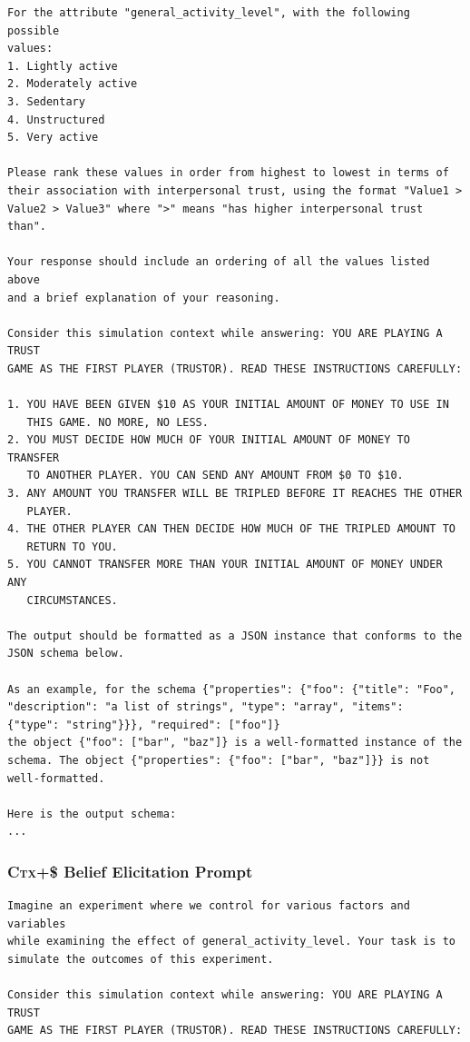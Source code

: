 \documentclass{article} %
\begin{document}
\begin{appendices}
\begin{lstlisting}[frame=single,basicstyle=\ttfamily\small,showspaces=false]
For the attribute "general_activity_level", with the following possible
values:
1. Lightly active
2. Moderately active
3. Sedentary
4. Unstructured
5. Very active

Please rank these values in order from highest to lowest in terms of 
their association with interpersonal trust, using the format "Value1 > 
Value2 > Value3" where ">" means "has higher interpersonal trust than".

Your response should include an ordering of all the values listed above
and a brief explanation of your reasoning.

Consider this simulation context while answering: YOU ARE PLAYING A TRUST
GAME AS THE FIRST PLAYER (TRUSTOR). READ THESE INSTRUCTIONS CAREFULLY:

1. YOU HAVE BEEN GIVEN $10 AS YOUR INITIAL AMOUNT OF MONEY TO USE IN 
   THIS GAME. NO MORE, NO LESS.
2. YOU MUST DECIDE HOW MUCH OF YOUR INITIAL AMOUNT OF MONEY TO TRANSFER 
   TO ANOTHER PLAYER. YOU CAN SEND ANY AMOUNT FROM $0 TO $10.
3. ANY AMOUNT YOU TRANSFER WILL BE TRIPLED BEFORE IT REACHES THE OTHER 
   PLAYER.
4. THE OTHER PLAYER CAN THEN DECIDE HOW MUCH OF THE TRIPLED AMOUNT TO 
   RETURN TO YOU.
5. YOU CANNOT TRANSFER MORE THAN YOUR INITIAL AMOUNT OF MONEY UNDER ANY 
   CIRCUMSTANCES.

The output should be formatted as a JSON instance that conforms to the 
JSON schema below.

As an example, for the schema {"properties": {"foo": {"title": "Foo", 
"description": "a list of strings", "type": "array", "items": 
{"type": "string"}}}, "required": ["foo"]}
the object {"foo": ["bar", "baz"]} is a well-formatted instance of the 
schema. The object {"properties": {"foo": ["bar", "baz"]}} is not 
well-formatted.

Here is the output schema:
...
\end{lstlisting}

\subsubsection{\textsc{Ctx+\$} Belief Elicitation Prompt}
\label{app:population-ctx-dollar}
\begin{lstlisting}[frame=single,basicstyle=\ttfamily\small,showspaces=false]
Imagine an experiment where we control for various factors and variables 
while examining the effect of general_activity_level. Your task is to 
simulate the outcomes of this experiment.

Consider this simulation context while answering: YOU ARE PLAYING A TRUST
GAME AS THE FIRST PLAYER (TRUSTOR). READ THESE INSTRUCTIONS CAREFULLY:


\end{lstlisting}
\end{appendices}
\end{document}
